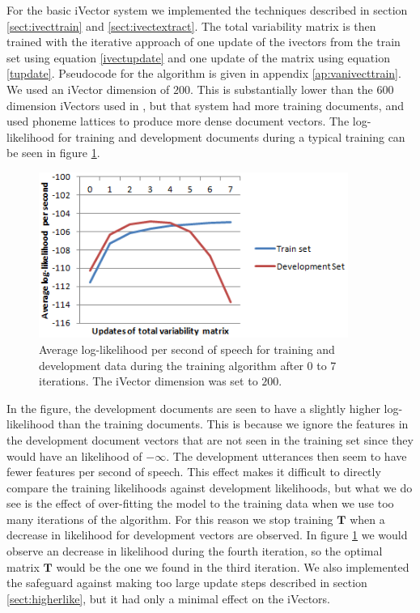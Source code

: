 For the basic iVector system we implemented the techniques described in section \ref{sect:ivecttrain} and \ref{sect:ivectextract}. The total variability matrix is then trained with the iterative approach of one update of the ivectors from the train set using equation \ref{ivectupdate} and one update of the matrix using equation \ref{tupdate}. Pseudocode for the algorithm is given in appendix \ref{ap:vanivecttrain}. We used an iVector dimension of $200$. This is substantially lower than the $600$ dimension iVectors used in \cite{lrivector}, but that system had more training documents, and used phoneme lattices to produce more dense document vectors. The log-likelihood for training and development documents during a typical training can be seen in figure \ref{fig:vanivecttrainlike}. 
\begin{figure}[hbt]
	\begin{center}
	\includegraphics[width=0.9\textwidth]{figures/vanivecttrainlike.png}
	\caption{Average log-likelihood per second of speech for training and development data during the training algorithm after 0 to 7 iterations. The iVector dimension was set to $200$.}
	\label{fig:vanivecttrainlike}
	\end{center}
\end{figure}
In the figure, the development documents are seen to have a slightly higher log-likelihood than the training documents. This is because we ignore the features in the development document vectors that are not seen in the training set since they would have an likelihood of $-\infty$. The development utterances then seem to have fewer features per second of speech. This effect makes it difficult to directly compare the training likelihoods against development likelihoods, but what we do see is the effect of over-fitting the model to the training data when we use too many iterations of the algorithm. For this reason we stop training $\mathbf{T}$ when a decrease in likelihood for development vectors are observed. In figure \ref{fig:vanivecttrainlike} we would observe an decrease in likelihood during the fourth iteration, so the optimal matrix $\mathbf{T}$ would be the one we found in the third iteration. We also implemented the safeguard against making too large update steps described in section \ref{sect:higherlike}, but it had only a minimal effect on the iVectors.

